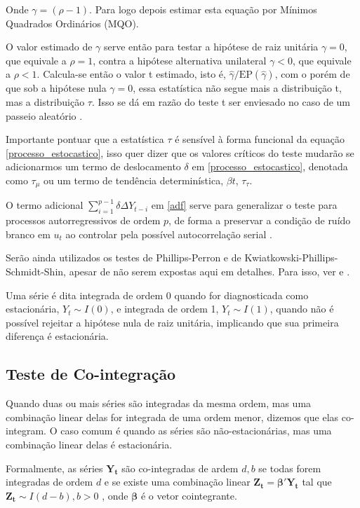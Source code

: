 \documentclass[a4paper,
               article,
               12pt,
               openany,
               oneside,
               english,
               brazil]{abntex2}
\numberwithin{equation}{section}
\begin{document}
    Onde $ \gamma = (\rho - 1) $. Para logo depois estimar esta equação por Mínimos Quadrados Ordinários (MQO).
   
    O valor estimado de $ \gamma $ serve então para testar a hipótese de raiz unitária $ \gamma = 0 $, que equivale a $ \rho = 1 $, contra a hipótese alternativa unilateral $ \gamma < 0 $, que equivale a $ \rho < 1 $. Calcula-se então o valor t estimado, isto é, $ \hat{\gamma} / \text{EP}(\hat{\gamma}) $, com o porém de que sob a hipótese nula $ \gamma = 0 $, essa estatística não segue mais a distribuição t, mas a distribuição $ \tau $. Isso se dá em razão do teste t ser enviesado no caso de um passeio aleatório \cite[p.~748-749]{gujarati}.

    Importante pontuar que a estatística $ \tau $ é sensível à forma funcional da equação \eqref{processo_estocastico}, isso quer dizer que os valores críticos do teste mudarão se adicionarmos um termo de deslocamento $ \delta $ em \eqref{processo_estocastico}, denotada como $ \tau_{\mu} $ ou um termo de tendência determinística, $ \beta t $, $ \tau_{\tau} $.
   
    O termo adicional $ \sum_{i = 1}^{p-1}\delta \Delta Y_{t-i} $ em \eqref{adf} serve para generalizar o teste para processos autorregressivos de ordem $ p $, de forma a preservar a condição de ruído branco em $ u_t $ ao controlar pela possível autocorrelação serial \cite[p.~40]{gustavo}.

    Serão ainda utilizados os testes de Phillips-Perron e de Kwiatkowski-Phillips-Schmidt-Shin, apesar de não serem expostas aqui em detalhes. Para isso, ver \textcite{pp} e \textcite{kpss}.

    Uma série é dita integrada de ordem 0 quando for diagnosticada como estacionária, $ Y_t \sim I(0) $, e integrada de ordem 1, $ Y_t \sim I(1) $, quando não é possível rejeitar a hipótese nula de raiz unitária, implicando que sua primeira diferença é estacionária.

    \subsection{Teste de Co-integração}

    Quando duas ou mais séries são integradas da mesma ordem, mas uma combinação linear delas for integrada de uma ordem menor, dizemos que elas co-integram. O caso comum é quando as séries são não-estacionárias, mas uma combinação linear delas é estacionária.
    
    Formalmente, as séries $ \mathbf{Y_t} $ são co-integradas de ardem $ d, b $ se todas forem integradas de ordem $ d $ e se existe uma combinação linear $ \mathbf{Z_t} = \pmb{\beta}'\mathbf{Y_t} $ tal que $ \mathbf{Z_t} \sim I(d - b), b > 0 $ \cite[p.~245]{lutkepool}, onde $ \pmb{\beta} $ é o vetor cointegrante.
\end{document}
